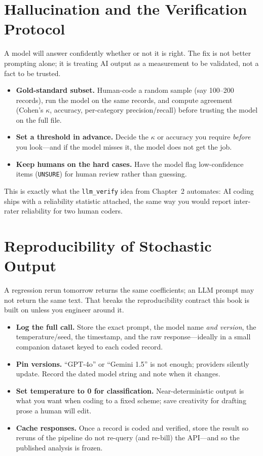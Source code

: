 \documentclass[
    a4paper,
    fontsize=10pt,
    twoside=true,
    numbers=noenddot,
]{kaobook}
\begin{document}
\section{Hallucination and the Verification Protocol}
A model will answer confidently whether or not it is right. The fix is not better prompting alone; it is treating AI output as a measurement to be validated, not a fact to be trusted.
\begin{itemize}
    \item \textbf{Gold-standard subset.} Human-code a random sample (say 100--200 records), run the model on the same records, and compute agreement (Cohen's $\kappa$, accuracy, per-category precision/recall) before trusting the model on the full file.
    \item \textbf{Set a threshold in advance.} Decide the $\kappa$ or accuracy you require \emph{before} you look---and if the model misses it, the model does not get the job.
    \item \textbf{Keep humans on the hard cases.} Have the model flag low-confidence items (\texttt{UNSURE}) for human review rather than guessing.
\end{itemize}
This is exactly what the \texttt{llm\_verify} idea from Chapter~2 automates: AI coding ships with a reliability statistic attached, the same way you would report inter-rater reliability for two human coders.

\section{Reproducibility of Stochastic Output}
A regression rerun tomorrow returns the same coefficients; an LLM prompt may not return the same text. That breaks the reproducibility contract this book is built on unless you engineer around it.
\begin{itemize}
    \item \textbf{Log the full call.} Store the exact prompt, the model name \emph{and version}, the temperature/seed, the timestamp, and the raw response---ideally in a small companion dataset keyed to each coded record.
    \item \textbf{Pin versions.} \enquote{GPT-4o} or \enquote{Gemini 1.5} is not enough; providers silently update. Record the dated model string and note when it changes.
    \item \textbf{Set temperature to 0 for classification.} Near-deterministic output is what you want when coding to a fixed scheme; save creativity for drafting prose a human will edit.
    \item \textbf{Cache responses.} Once a record is coded and verified, store the result so reruns of the pipeline do not re-query (and re-bill) the API---and so the published analysis is frozen.
\end{itemize}
\end{document}
